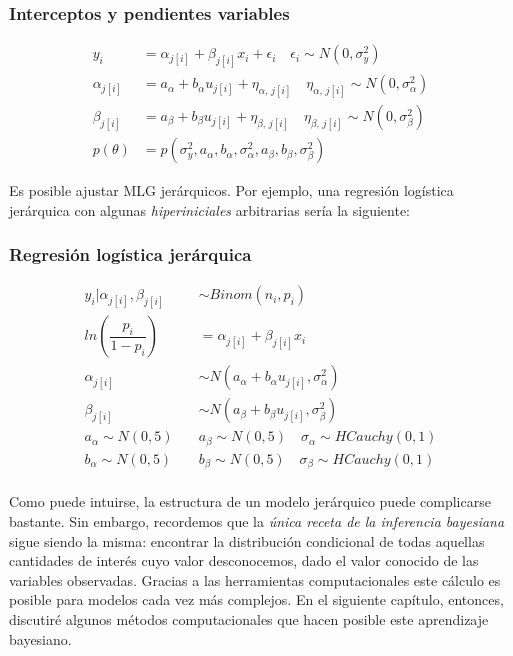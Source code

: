 \subsubsection*{Interceptos y pendientes variables}
\begin{align*}
y_i &= \alpha_{j[i]} + \beta_{j[i]} x_i + \epsilon_i  \quad \epsilon_i  \sim N(0,\sigma_y^2) \\
\alpha_{j[i]} &= a_{\alpha} + b_{\alpha} u_{j[i]} + \eta_{\alpha,\,j[i]} \quad \eta_{\alpha,\,j[i]}  \sim N(0, \sigma_{\alpha}^2) \\ 
\beta_{j[i]} &= a_{\beta} + b_{\beta} u_{j[i]} + \eta_{\beta,\,j[i]} \quad \eta_{\beta,\,j[i]}  \sim N(0, \sigma_{\beta}^2) \\ 
p(\theta) &= p(\sigma_y^2,a_{\alpha},b_{\alpha},\sigma_{\alpha}^2,a_{\beta},b_{\beta},\sigma_{\beta}^2)
\end{align*}

Es posible ajustar MLG jerárquicos. Por ejemplo, una regresión logística jerárquica con algunas \textit{hiperiniciales} arbitrarias sería la siguiente: 

\subsubsection*{Regresión logística jerárquica}
\begin{align*}
y_i|\alpha_{j[i]},\beta_{j[i]} & \sim Binom(n_i,p_i) \\
ln\left(\dfrac{p_i}{1-p_i}\right) &= \alpha_{j[i]} + \beta_{j[i]} x_i  \\ 
\alpha_{j[i]} & \sim N(a_{\alpha} + b_{\alpha} u_{j[i]}, \sigma_{\alpha}^2) \\ 
\beta_{j[i]} & \sim N(a_{\beta} + b_{\beta} u_{j[i]}, \sigma_{\beta}^2) \\ 
a_{\alpha} \sim N(0,5) \quad & a_{\beta} \sim N(0,5) \quad \sigma_{\alpha} \sim HCauchy(0,1) \\
b_{\alpha} \sim N(0,5) \quad & b_{\beta} \sim N(0,5) \quad \sigma_{\beta} \sim HCauchy(0,1) \\
\end{align*}

Como puede intuirse, la estructura de un modelo jerárquico puede complicarse bastante. Sin embargo, recordemos que la \textit{única receta de la inferencia bayesiana} sigue siendo la misma: encontrar la distribución condicional de todas aquellas cantidades de interés cuyo valor desconocemos, dado el valor conocido de las variables observadas. Gracias a las herramientas computacionales este cálculo es posible para modelos cada vez más complejos. En el siguiente capítulo, entonces, discutiré algunos métodos computacionales que hacen posible este aprendizaje bayesiano. 
